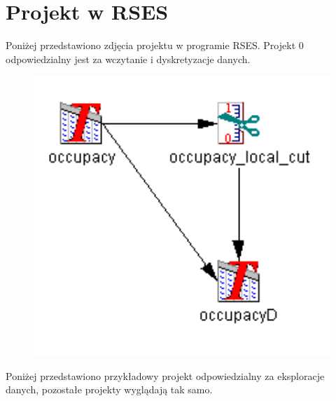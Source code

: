 \documentclass[12pt,oneside,a4paper]{book} %
\theoremstyle{break}
\begin{document}
\chapter*{Projekt w RSES}

Poniżej przedstawiono zdjęcia projektu w programie RSES.
Projekt 0 odpowiedzialny jest za wczytanie i dyskretyzacje danych.
\begin{figure}[H]
  \centering
  \includegraphics[width=1\textwidth]{project0.png}
\end{figure}

Poniżej przedstawiono przykładowy projekt odpowiedzialny za eksploracje danych, pozostałe projekty wyglądają tak samo.
\end{document}

